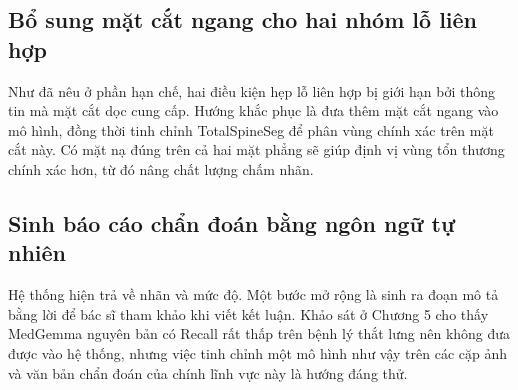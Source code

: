 \subsection{Bổ sung mặt cắt ngang cho hai nhóm lỗ liên hợp}

Như đã nêu ở phần hạn chế, hai điều kiện hẹp lỗ liên hợp bị giới hạn bởi thông tin mà mặt cắt dọc cung cấp. Hướng khắc phục là đưa thêm mặt cắt ngang vào mô hình, đồng thời tinh chỉnh TotalSpineSeg để phân vùng chính xác trên mặt cắt này. Có mặt nạ đúng trên cả hai mặt phẳng sẽ giúp định vị vùng tổn thương chính xác hơn, từ đó nâng chất lượng chấm nhãn.

\subsection{Sinh báo cáo chẩn đoán bằng ngôn ngữ tự nhiên}

Hệ thống hiện trả về nhãn và mức độ. Một bước mở rộng là sinh ra đoạn mô tả bằng lời để bác sĩ tham khảo khi viết kết luận. Khảo sát ở Chương 5 cho thấy MedGemma nguyên bản có Recall rất thấp trên bệnh lý thắt lưng nên không đưa được vào hệ thống, nhưng việc tinh chỉnh một mô hình như vậy trên các cặp ảnh và văn bản chẩn đoán của chính lĩnh vực này là hướng đáng thử.
